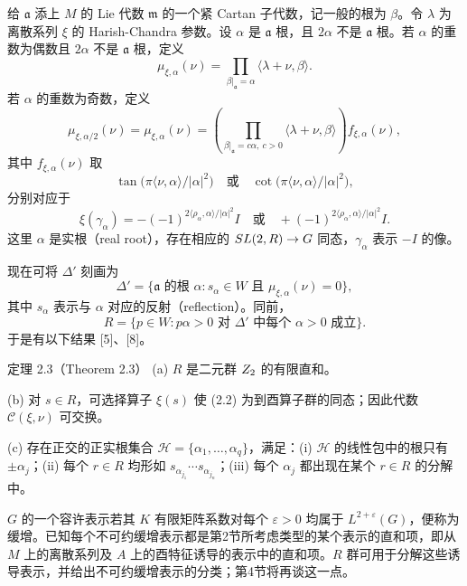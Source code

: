 给 $\mathfrak a$ 添上 $M$ 的 Lie 代数 $\mathfrak m$ 的一个紧 Cartan 子代数，记一般的根为 $\beta$。令 $\lambda$ 为离散系列 $\xi$ 的 Harish-Chandra 参数。设 $\alpha$ 是 $\mathfrak a$ 根，且 $2\alpha$ 不是 $\mathfrak a$ 根。若 $\alpha$ 的重数为偶数且 $2\alpha$ 不是 $\mathfrak a$ 根，定义
\[
 \mu_{\xi,\alpha}(\nu)=\prod_{\beta|_{\mathfrak a}=\alpha}\langle\lambda+\nu,\beta\rangle.
\]
若 $\alpha$ 的重数为奇数，定义
\[
 \mu_{\xi,\alpha/2}(\nu)=\mu_{\xi,\alpha}(\nu)
 =\left(\prod_{\beta|_{\mathfrak a}=c\alpha,\ c>0}\langle\lambda+\nu,\beta\rangle\right)f_{\xi,\alpha}(\nu),
\]
其中 $f_{\xi,\alpha}(\nu)$ 取
\[
 \tan\bigl(\pi\langle\nu,\alpha\rangle/|\alpha|^2\bigr)
 \quad\text{或}\quad
 \cot\bigl(\pi\langle\nu,\alpha\rangle/|\alpha|^2\bigr),
\]
分别对应于
\[
 \xi(\gamma_\alpha)=-(-1)^{2\langle\rho_\alpha,\alpha\rangle/|\alpha|^2}I
 \quad\text{或}\quad
 +(-1)^{2\langle\rho_\alpha,\alpha\rangle/|\alpha|^2}I.
\]
这里 $\alpha$ 是实根（real root），存在相应的 $SL(2,R)\to G$ 同态，$\gamma_\alpha$ 表示 $-I$ 的像。

现在可将 $\Delta'$ 刻画为
\[
 \Delta'=\{\mathfrak a\text{ 的根 }\alpha:s_\alpha\in W\text{ 且 }\mu_{\xi,\alpha}(\nu)=0\},
\]
其中 $s_\alpha$ 表示与 $\alpha$ 对应的反射（reflection）。同前，
\[
 R=\{p\in W:p\alpha>0\text{ 对 }\Delta'\text{ 中每个 }\alpha>0\text{ 成立}\}.
\]
于是有以下结果 [5]、[8]。
\begin{originaltheorem}{定理 2.3（Theorem 2.3）}
(a) $R$ 是二元群 $Z_2$ 的有限直和。

(b) 对 $s\in R$，可选择算子 $\xi(s)$ 使 (2.2) 为到酉算子群的同态；因此代数 $\mathcal C(\xi,\nu)$ 可交换。

(c) 存在正交的正实根集合 $\mathcal H=\{\alpha_1,\ldots,\alpha_q\}$，满足：(i) $\mathcal H$ 的线性包中的根只有 $\pm\alpha_j$；(ii) 每个 $r\in R$ 均形如 $s_{\alpha_{j_1}}\cdots s_{\alpha_{j_n}}$；(iii) 每个 $\alpha_j$ 都出现在某个 $r\in R$ 的分解中。
\end{originaltheorem}

$G$ 的一个容许表示若其 $K$ 有限矩阵系数对每个 $\varepsilon>0$ 均属于 $L^{2+\varepsilon}(G)$，便称为缓增。已知每个不可约缓增表示都是第2节所考虑类型的某个表示的直和项，即从 $M$ 上的离散系列及 $A$ 上的酉特征诱导的表示中的直和项。$R$ 群可用于分解这些诱导表示，并给出不可约缓增表示的分类；第4节将再谈这一点。


